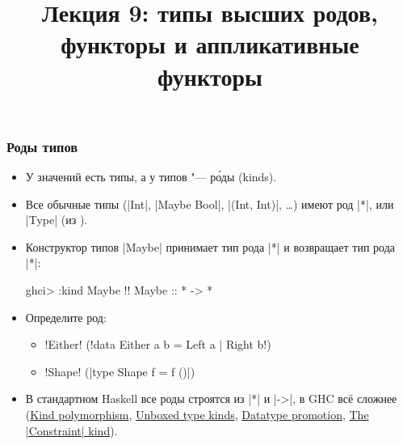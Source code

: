 \documentclass[11pt]{beamer}
\title{Лекция 9: типы высших родов, функторы и аппликативные функторы}
\begin{document}
\begin{frame}[plain]
  \maketitle
\end{frame}

\begin{frame}[fragile]
  \frametitle{Роды типов}
  \begin{itemize}
    \item У значений есть типы, а у типов "--- р\'{о}ды (kinds).
    \item Все обычные типы (\haskinline|Int|, \haskinline|Maybe Bool|, \haskinline|(Int, Int)|, \ldots) имеют род \haskinline|*|, или \haskinline|Type| (из \href{https://hackage.haskell.org/package/base/docs/Data-Kind.html}{}).
          \pause
    \item Конструктор типов \haskinline|Maybe| принимает тип рода \haskinline|*| и возвращает тип рода \haskinline|*|:
          \begin{haskell}
            ghci> :kind Maybe !\pause!
            Maybe :: * -> *
          \end{haskell}
          \pause
    \item Определите род:
          \begin{itemize}
            \item \haskinline!Either! (\haskinline!data Either a b = Left a | Right b!)
                  \pause
            \item \haskinline!Shape! (\haskinline|type Shape f = f ()|)
                  \pause
          \end{itemize}
    \item В стандартном Haskell все роды строятся из \haskinline|*| и \haskinline|->|, в GHC всё сложнее (\href{https://downloads.haskell.org/~ghc/latest/docs/html/users_guide/exts/poly_kinds.html}{Kind polymorphism}, \href{https://downloads.haskell.org/~ghc/latest/docs/html/users_guide/exts/primitives.html}{Unboxed type kinds}, \href{https://downloads.haskell.org/~ghc/latest/docs/html/users_guide/exts/data_kinds.html}{Datatype promotion},  \href{https://downloads.haskell.org/~ghc/latest/docs/html/users_guide/exts/constraint_kind.html}{The \haskinline|Constraint| kind}).
  \end{itemize}
\end{frame}
\end{document}
